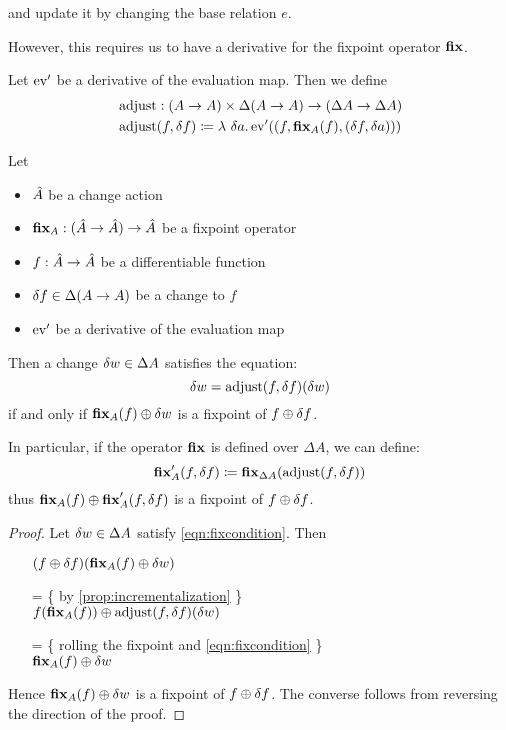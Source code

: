 and update it by changing the base relation $e$.

However, this requires us to have a derivative for the fixpoint operator $\textbf{fix}$.

\begin{defn}
  Let $\operatorname{ev}'$ be a derivative of the evaluation map. Then we define
  \begin{align*}
    &\operatorname{adjust} : (A \rightarrow A) \times \Delta (A \rightarrow A) \rightarrow (\Delta A \rightarrow \Delta A)\\
    &\operatorname{adjust}(f, \delta f) \coloneqq \lambda\ \delta a . \operatorname{ev}'((f,
    \textbf{fix}_A(f), (\delta f, \delta a)))
  \end{align*}
\end{defn}

\begin{thm}
\label{thm:fixpointDiff}
  Let
  \begin{itemize}
    \item $\hat{A}$ be a change action
    \item $\textbf{fix}_A : (\hat{A} \rightarrow \hat{A}) \rightarrow \hat{A}$ be a fixpoint operator
    \item $f: \hat{A} \rightarrow \hat{A}$ be a differentiable function
    \item $\delta f \in \Delta (A \rightarrow A)$ be a change to $f$
    \item $\operatorname{ev}'$ be a derivative of the evaluation map
  \end{itemize}

  Then a change $\delta w \in \Delta A$ satisfies
  the equation:
  \begin{equation}\label{eqn:fixcondition}
    \delta w = \operatorname{adjust}(f, \delta f)(\delta w)
  \end{equation}
  if and only if $\textbf{fix}_A(f) \oplus \delta w$ is a fixpoint of $f \oplus \delta f$.

  In particular, if the operator $\textbf{fix}$ is defined over $\Delta A$, we can define:
  $$
  \textbf{fix}_A'(f, \delta f) \coloneqq \textbf{fix}_{\Delta A}(\operatorname{adjust}(f, \delta f))
  $$
  thus $\textbf{fix}_A(f) \oplus \textbf{fix}_A'(f, \delta f)$ is a fixpoint
  of $f \oplus \delta f$.
\end{thm}
\ifproofs
\begin{proof}
  Let $\delta w \in \Delta A$ satisfy \cref{eqn:fixcondition}. Then
  \begin{itemize}
  \item[ ]
    $
    (f \oplus \delta f)(\textbf{fix}_A(f) \oplus \delta w)
    $
  \item[=]\{ by \cref{prop:incrementalization} \}\\
    $
    f(\textbf{fix}_A(f))
    \oplus
    \operatorname{adjust}(f, \delta f)(\delta w)
    $
  \item[=]\{ rolling the fixpoint and \cref{eqn:fixcondition} \}\\
    $
    \textbf{fix}_A(f)
    \oplus
    \delta w
    $
  \end{itemize}
  Hence $\textbf{fix}_A(f) \oplus \delta w$ is a fixpoint of $f \oplus \delta f$. The converse
  follows from reversing the direction of the proof.
\end{proof}
